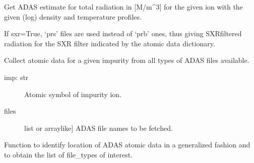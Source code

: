 \documentclass[letterpaper,10pt,english]{sphinxmanual}
\begin{document}

\begin{fulllineitems}
\label{\detokenize{aurora:aurora.atomic.get_adas_ion_rad}}
Get ADAS estimate for total radiation in {[}M/m\textasciicircum{}3{]} for the given ion
with the given (log) density and temperature profiles.

If sxr=True, ‘prs’ files are used instead of ‘prb’ ones, thus giving SXR\sphinxhyphen{}filtered
radiation for the SXR filter indicated by the atomic data dictionary.

\end{fulllineitems}


\begin{fulllineitems}
\label{\detokenize{aurora:aurora.atomic.get_all_atom_data}}
Collect atomic data for a given impurity from all types of ADAS files available.
\begin{description}
\item[{imp: str}] \leavevmode
Atomic symbol of impurity ion.

\item[{files}] \leavevmode{[}list or array\sphinxhyphen{}like{]}
ADAS file names to be fetched.

\end{description}

\end{fulllineitems}


\begin{fulllineitems}
\label{\detokenize{aurora:aurora.atomic.get_atomdat_info}}
Function to identify location of ADAS atomic data in a generalized fashion
and to obtain the list of file\_types of interest.

\end{fulllineitems}
\end{document}
